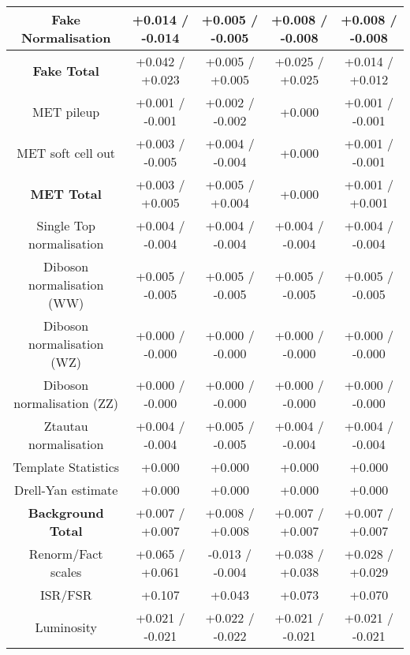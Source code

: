 \begin{table}[htbp]
\begin{center}
\begin{tabular}{|c|c|c|c|c|}
 Fake Normalisation                    &+0.014   / -0.014   & +0.005   / -0.005   & +0.008   / -0.008   & +0.008   / -0.008  \\
 \hline
 \textbf{Fake Total}                   &+0.042   / +0.023   & +0.005   / +0.005   & +0.025   / +0.025   & +0.014   / +0.012  \\
 \hline
 MET pileup                            &+0.001   / -0.001   & +0.002   / -0.002   & +0.000              & +0.001   / -0.001  \\
 MET soft cell out                     &+0.003   / -0.005   & +0.004   / -0.004   & +0.000              & +0.001   / -0.001  \\
 \hline
 \textbf{MET Total}                    &+0.003   / +0.005   & +0.005   / +0.004   & +0.000              & +0.001   / +0.001  \\
 \hline
 Single Top normalisation              &+0.004   / -0.004   & +0.004   / -0.004   & +0.004   / -0.004   & +0.004   / -0.004  \\
 Diboson normalisation (WW)            &+0.005   / -0.005   & +0.005   / -0.005   & +0.005   / -0.005   & +0.005   / -0.005  \\
 Diboson normalisation (WZ)            &+0.000   / -0.000   & +0.000   / -0.000   & +0.000   / -0.000   & +0.000   / -0.000  \\
 Diboson normalisation (ZZ)            &+0.000   / -0.000   & +0.000   / -0.000   & +0.000   / -0.000   & +0.000   / -0.000  \\
 Ztautau normalisation                 &+0.004   / -0.004   & +0.005   / -0.005   & +0.004   / -0.004   & +0.004   / -0.004  \\
 Template Statistics                   &+0.000              & +0.000              & +0.000              & +0.000             \\
 Drell-Yan estimate                    &+0.000              & +0.000              & +0.000              & +0.000             \\
 \hline
 \textbf{Background Total}             &+0.007   / +0.007   & +0.008   / +0.008   & +0.007   / +0.007   & +0.007   / +0.007  \\
 \hline
 Renorm/Fact scales                    &+0.065   / +0.061   & -0.013   / -0.004   & +0.038   / +0.038   & +0.028   / +0.029  \\
 ISR/FSR                               &+0.107              & +0.043              & +0.073              & +0.070             \\
 Luminosity                            &+0.021   / -0.021   & +0.022   / -0.022   & +0.021   / -0.021   & +0.021   / -0.021  \\

\end{tabular}
\end{center}
\end{table}
